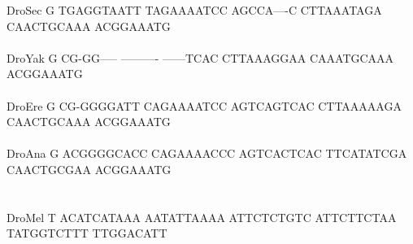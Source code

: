 \documentclass[11pt,twoside,reqno,a4paper]{article}
\begin{document}
{DroSec	G	TGAGGTAATT	TAGAAAATCC	AGCCA----C	CTTAAATAGA	CAACTGCAAA	ACGGAAATG\\
\hspace*{7\charwidth}\hspace*{1\charwidth}\hspace*{1\charwidth}\hspace*{1\charwidth}\hspace*{1\charwidth}\hspace*{1\charwidth}\hspace*{1\charwidth}\\
DroYak	G	CG-GG-----	----------	------TCAC	CTTAAAGGAA	CAAATGCAAA	ACGGAAATG\\
\hspace*{7\charwidth}\hspace*{1\charwidth}\hspace*{1\charwidth}\hspace*{1\charwidth}\hspace*{1\charwidth}\hspace*{1\charwidth}\hspace*{1\charwidth}\\
DroEre	G	CG-GGGGATT	CAGAAAATCC	AGTCAGTCAC	CTTAAAAAGA	CAACTGCAAA	ACGGAAATG\\
\hspace*{7\charwidth}\hspace*{1\charwidth}\hspace*{1\charwidth}\hspace*{1\charwidth}\hspace*{1\charwidth}\hspace*{1\charwidth}\hspace*{1\charwidth}\\
DroAna	G	ACGGGGCACC	CAGAAAACCC	AGTCACTCAC	TTCATATCGA	CAACTGCGAA	ACGGAAATG\\
\hspace*{7\charwidth}\hspace*{1\charwidth}\hspace*{1\charwidth}\hspace*{1\charwidth}\hspace*{1\charwidth}\hspace*{1\charwidth}\hspace*{1\charwidth}\\
\\
DroMel	T	ACATCATAAA	AATATTAAAA	ATTCTCTGTC	ATTCTTCTAA	TATGGTCTTT	TTGGACATT\\
\hspace*{7\charwidth}\hspace*{1\charwidth}\hspace*{1\charwidth}\hspace*{1\charwidth}\hspace*{1\charwidth}\hspace*{1\charwidth}\hspace*{1\charwidth}\\
}
\end{document}
